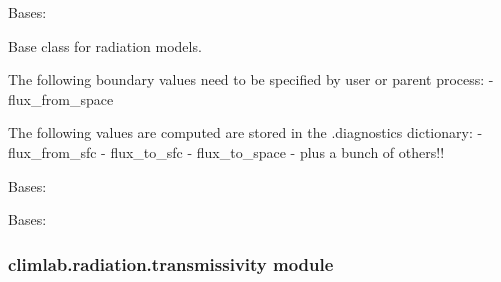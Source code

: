 \documentclass[letterpaper,10pt,english]{sphinxmanual}
\begin{document}
\begin{fulllineitems}
\label{api/climlab.radiation:climlab.radiation.radiation.Radiation}
Bases: {\hyperref[api/climlab.process:climlab.process.energy_budget.EnergyBudget]{\emph{}}}

Base class for radiation models.

The following boundary values need to be specified by user or parent process:
- flux\_from\_space

The following values are computed are stored in the .diagnostics dictionary:
- flux\_from\_sfc
- flux\_to\_sfc
- flux\_to\_space
-  plus a bunch of others!!

\end{fulllineitems}


\begin{fulllineitems}
\label{api/climlab.radiation:climlab.radiation.radiation.RadiationLW}
Bases: {\hyperref[api/climlab.radiation:climlab.radiation.radiation.Radiation]{\emph{}}}

\end{fulllineitems}


\begin{fulllineitems}
\label{api/climlab.radiation:climlab.radiation.radiation.RadiationSW}
Bases: {\hyperref[api/climlab.radiation:climlab.radiation.radiation.Radiation]{\emph{}}}

\end{fulllineitems}



\subsubsection{climlab.radiation.transmissivity module}
\label{api/climlab.radiation:module-climlab.radiation.transmissivity}\label{api/climlab.radiation:climlab-radiation-transmissivity-module}
\end{document}
